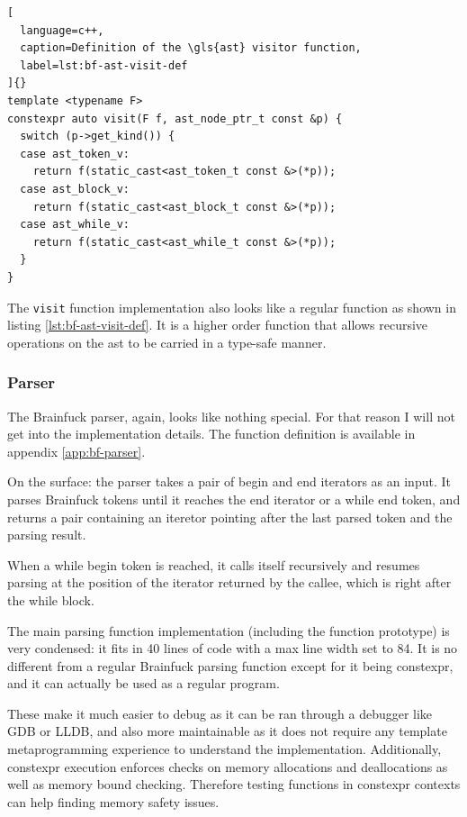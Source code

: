 \documentclass[../main]{subfiles}
\begin{document}
\begin{lstlisting}[
  language=c++,
  caption=Definition of the \gls{ast} visitor function,
  label=lst:bf-ast-visit-def
]{}
template <typename F>
constexpr auto visit(F f, ast_node_ptr_t const &p) {
  switch (p->get_kind()) {
  case ast_token_v:
    return f(static_cast<ast_token_t const &>(*p));
  case ast_block_v:
    return f(static_cast<ast_block_t const &>(*p));
  case ast_while_v:
    return f(static_cast<ast_while_t const &>(*p));
  }
}
\end{lstlisting}

The \lstinline{visit} function implementation also looks like a regular \cpp
function as shown in listing \ref{lst:bf-ast-visit-def}.
It is a higher order function that allows recursive operations on the \gls{ast}
to be carried in a type-safe manner.

\subsubsection{
  Parser
}

The Brainfuck parser, again, looks like nothing special. For that reason I will
not get into the implementation details. The function definition is available
in appendix \ref{app:bf-parser}.

On the surface: the parser takes a pair of begin and end iterators as an input.
It parses Brainfuck tokens until it reaches the end iterator or a while end
token, and returns a pair containing an iteretor pointing after the last parsed
token and the parsing result.

When a while begin token is reached, it calls itself recursively and resumes
parsing at the position of the iterator returned by the callee, which is right
after the while block.

The main parsing function implementation (including the function prototype)
is very condensed: it fits in 40 lines of code with a max line width set to 84.
It is no different from a regular Brainfuck parsing function except for it being
\gls{constexpr}, and it can actually be used as a regular \cpp program.

These make it much easier to debug as it can be ran through a \cpp debugger like
GDB or LLDB, and also more maintainable as it does not require any
template metaprogramming experience to understand the implementation.
Additionally, \gls{constexpr} execution enforces checks on memory allocations and
deallocations as well as memory bound checking. Therefore testing functions
in \gls{constexpr} contexts can help finding memory safety issues.
\end{document}
